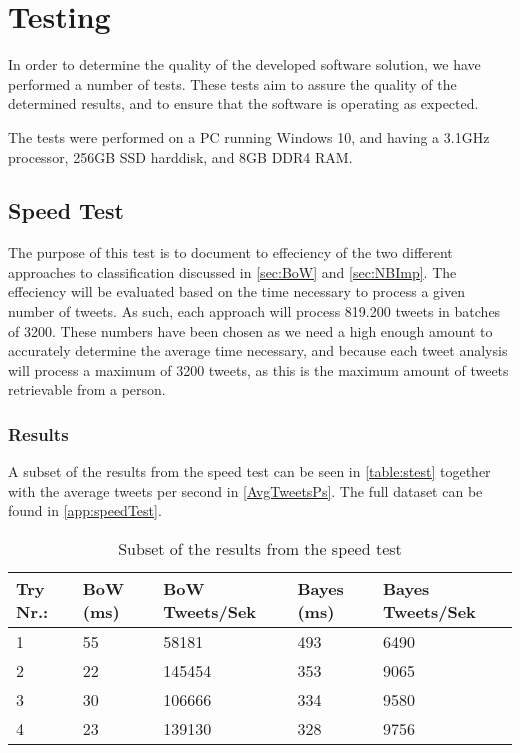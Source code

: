 \chapter{Testing}
In order to determine the quality of the developed software solution, we have
performed a number of tests. These tests aim to assure the quality of the
determined results, and to ensure that the software is operating as expected.\nl

The tests were performed on a PC running Windows 10, and having a 3.1GHz
processor, 256GB SSD harddisk, and 8GB DDR4 RAM.

\section{Speed Test}\label{speedtestlavel}
The purpose of this test is to document to effeciency of the two different
approaches to classification discussed in \autoref{sec:BoW} and
\autoref{sec:NBImp}. The effeciency will be evaluated based on the time
necessary to process a given number of tweets. As such, each approach will
process 819.200 tweets in batches of 3200. These numbers have been chosen as we
need a high enough amount to accurately determine the average time necessary,
and because each tweet analysis will process a maximum of 3200 tweets, as this
is the maximum amount of tweets retrievable from a person.

\subsection*{Results}
A subset of the results from the speed test can be seen in \autoref{table:stest}
together with the average tweets per second in \autoref{AvgTweetsPs}. The
full dataset can be found in \autoref{app:speedTest}.

\begin{table}[H]\centering
\begin{tabular}{|l|l|l|l|l|}
\hline
Try Nr.:	&	BoW (ms)	&	BoW Tweets/Sek	&	Bayes (ms)	&	Bayes Tweets/Sek	\\\hline
1	&	55	&	58181	&	493	&	6490 \\\hline
2	&	22	&	145454	&	353	&	9065 \\\hline
3	&	30	&	106666	&	334	&	9580 \\\hline
4	&	23	&	139130	&	328	&	9756 \\\hline		
\end{tabular}
\caption{Subset of the results from the speed test}
\label{table:stest}
\end{table}

